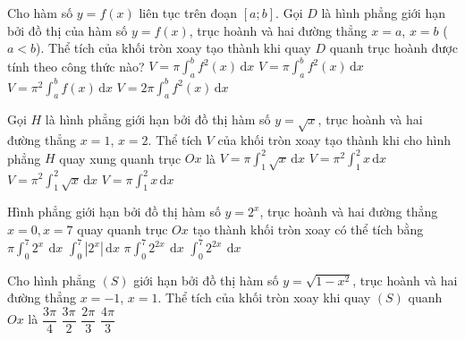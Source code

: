 \begin{ex}%
	Cho hàm số $y = f(x)$ liên tục trên đoạn $[a;b]$. Gọi $D$ là hình phẳng giới hạn bởi đồ thị của hàm số $y = f(x)$, trục hoành và hai đường thẳng $x = a$, $x = b$ ($a < b$). Thể tích  của khối tròn xoay tạo thành khi quay $D$ quanh trục hoành được tính theo công thức nào?
	\choice 
		{\True $V =  \pi \displaystyle\int_a^b f^2(x) \mathrm{\,d}x$}
		 {$V = \pi \displaystyle\int_a^b f^2(x) \mathrm{\,d}x$}
		{$V =  \pi^2 \displaystyle\int_a^b f(x) \mathrm{\,d}x$}
		{$V = 2\pi  \displaystyle\int_a^b f^2(x) \mathrm{\,d}x$}
\end{ex}

\begin{ex}%
	Gọi $H$ là hình phẳng giới hạn bởi đồ thị hàm số $y=\sqrt{x}$, trục hoành và hai đường thẳng $x=1$, $x=2$. Thể tích $V$ của khối tròn xoay tạo thành khi cho hình phẳng $H$ quay xung quanh trục  $Ox$ là
	 \choice
		{$V=\pi  \displaystyle\int_1^2 \sqrt{x} \mathrm{\,d} x$}
		{$V=\pi^2\displaystyle\int_1^2  x \mathrm{\,d} x$}
		{$V=\pi^2\displaystyle\int_1^2 \sqrt{x}  \mathrm{\,d} x$}
		{\True $V=\pi\displaystyle\int_1^2  x \mathrm{\,d} x$}
\end{ex}

\begin{ex}%
	Hình phẳng giới hạn bởi đồ thị hàm số $y=2^{x}$, trục hoành và hai đường thẳng $x=0, x=7$ quay quanh trục $Ox$ tạo  thành khối tròn xoay có thể tích bằng
	\choice 
		 {$\pi\displaystyle\int_{0}^{7}2^{x}~\mathrm{\,d}x$}
		{$\displaystyle\int_{0}^{7}\left|2^{x}\right|\mathrm{\,d}x$} 
		{\True $\pi\displaystyle\int_{0}^{7}2^{2x}~\mathrm{\,d}x$} 
		 {$\displaystyle\int_{0}^{7}2^{2x}~\mathrm{\,d}x$}
\end{ex}

\begin{ex}%
	Cho hình phẳng $\left(S\right)$ giới hạn bởi đồ  thị hàm số $y=\sqrt{1-x^2}$, trục hoành và hai đường thẳng $x=-1$, $ x=1$. Thể tích của khối tròn xoay khi quay $\left(S\right)$ quanh $Ox$ là
	\choice 
		 {$\dfrac{3 \pi}{4}$}
		{$\dfrac{3 \pi}{2}$} 
		 {$\dfrac{2 \pi}{3}$}
		{\True  $\dfrac{4 \pi}{3}$}
\end{ex}

